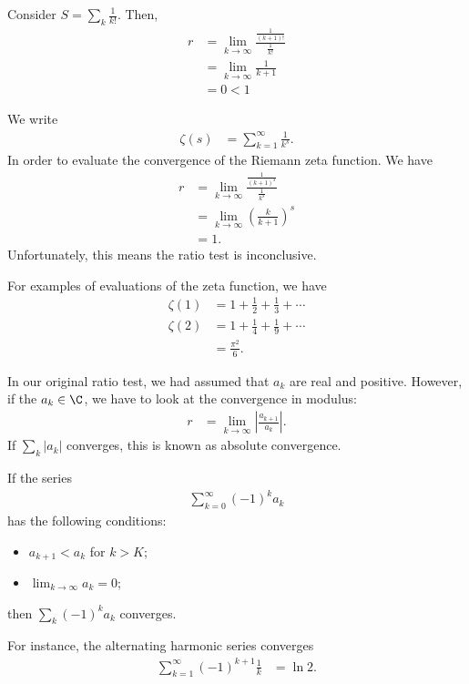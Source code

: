 \documentclass[10pt]{mypackage}
\begin{document}
\begin{example}
  Consider $S = \sum_{k}\frac{1}{k!}$. Then,
  \begin{align*}
    r &= \lim_{k\rightarrow\infty}\frac{\frac{1}{(k+1)!}}{\frac{1}{k!}}\\
      &= \lim_{k\rightarrow\infty}\frac{1}{k+1}\\
      &= 0 < 1
  \end{align*}
\end{example}
\begin{example}
  We write
  \begin{align*}
    \zeta(s) &= \sum_{k=1}^{\infty}\frac{1}{k^s}.
  \end{align*}
  In order to evaluate the convergence of the Riemann zeta function. We have
  \begin{align*}
    r &= \lim_{k\rightarrow\infty}\frac{\frac{1}{(k+1)^s}}{\frac{1}{k^s}}\\
      &= \lim_{k\rightarrow\infty}\left(\frac{k}{k+1}\right)^s\\
      &= 1.
  \end{align*}
  Unfortunately, this means the ratio test is inconclusive.\newline

  For examples of evaluations of the zeta function, we have
  \begin{align*}
    \zeta(1) &= 1 + \frac{1}{2} + \frac{1}{3} + \cdots\\
    \zeta(2) &= 1 + \frac{1}{4} + \frac{1}{9} + \cdots\\
             &= \frac{\pi^2}{6}.
  \end{align*}
\end{example}
\begin{example}
  In our original ratio test, we had assumed that $a_k$ are real and positive. However, if the $a_k\in \C$, we have to look at the convergence in modulus:
  \begin{align*}
    r &= \lim_{k\rightarrow\infty}\left\vert \frac{a_{k+1}}{a_k} \right\vert.
  \end{align*}
  If $\sum_{k}\left\vert a_k \right\vert$ converges, this is known as absolute convergence.
\end{example}
\begin{example}
  If the series
  \begin{align*}
    \sum_{k=0}^{\infty}\left(-1\right)^ka_{k}
  \end{align*}
  has the following conditions:
  \begin{itemize}
    \item $a_{k+1} < a_k$ for $k > K$;
    \item $\lim_{k\rightarrow\infty}a_k = 0$;
  \end{itemize}
  then $\sum_{k}\left(-1\right)^ka_k$ converges.\newline

  For instance, the alternating harmonic series converges
  \begin{align*}
    \sum_{k=1}^{\infty}\left(-1\right)^{k+1}\frac{1}{k} &= \ln 2.
  \end{align*}
\end{example}
\end{document}

